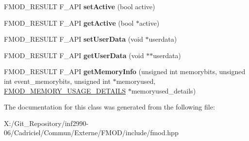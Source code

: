 \begin{DoxyCompactItemize}
\item 
\hypertarget{class_f_m_o_d_1_1_reverb_ace7f7f68d6f6298a356b9ee831f50aae}{F\-M\-O\-D\-\_\-\-R\-E\-S\-U\-L\-T F\-\_\-\-A\-P\-I {\bfseries set\-Active} (bool active)}\label{class_f_m_o_d_1_1_reverb_ace7f7f68d6f6298a356b9ee831f50aae}

\item 
\hypertarget{class_f_m_o_d_1_1_reverb_a50f3bbcec09517e400fa606330738e2b}{F\-M\-O\-D\-\_\-\-R\-E\-S\-U\-L\-T F\-\_\-\-A\-P\-I {\bfseries get\-Active} (bool $\ast$active)}\label{class_f_m_o_d_1_1_reverb_a50f3bbcec09517e400fa606330738e2b}

\item 
\hypertarget{class_f_m_o_d_1_1_reverb_ad29004efcf52bf367bc13fde07527647}{F\-M\-O\-D\-\_\-\-R\-E\-S\-U\-L\-T F\-\_\-\-A\-P\-I {\bfseries set\-User\-Data} (void $\ast$userdata)}\label{class_f_m_o_d_1_1_reverb_ad29004efcf52bf367bc13fde07527647}

\item 
\hypertarget{class_f_m_o_d_1_1_reverb_ac12115e79aebe3f8150c971b75de38c7}{F\-M\-O\-D\-\_\-\-R\-E\-S\-U\-L\-T F\-\_\-\-A\-P\-I {\bfseries get\-User\-Data} (void $\ast$$\ast$userdata)}\label{class_f_m_o_d_1_1_reverb_ac12115e79aebe3f8150c971b75de38c7}

\item 
\hypertarget{class_f_m_o_d_1_1_reverb_a9be1262ba585537bdd32e569eb999d05}{F\-M\-O\-D\-\_\-\-R\-E\-S\-U\-L\-T F\-\_\-\-A\-P\-I {\bfseries get\-Memory\-Info} (unsigned int memorybits, unsigned int event\-\_\-memorybits, unsigned int $\ast$memoryused, \hyperlink{struct_f_m_o_d___m_e_m_o_r_y___u_s_a_g_e___d_e_t_a_i_l_s}{F\-M\-O\-D\-\_\-\-M\-E\-M\-O\-R\-Y\-\_\-\-U\-S\-A\-G\-E\-\_\-\-D\-E\-T\-A\-I\-L\-S} $\ast$memoryused\-\_\-details)}\label{class_f_m_o_d_1_1_reverb_a9be1262ba585537bdd32e569eb999d05}

\end{DoxyCompactItemize}


The documentation for this class was generated from the following file\-:\begin{DoxyCompactItemize}
\item 
X\-:/\-Git\-\_\-\-Repository/inf2990-\/06/\-Cadriciel/\-Commun/\-Externe/\-F\-M\-O\-D/include/fmod.\-hpp\end{DoxyCompactItemize}
